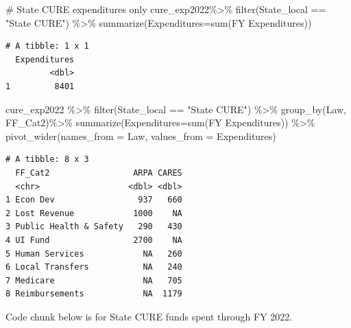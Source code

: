 \documentclass[
  letterpaper,
  DIV=11,
  numbers=noendperiod]{scrreport}
\newenvironment{Shaded}{\begin{snugshade}}{\end{snugshade}}
\newcommand{\AttributeTok}[1]{\textcolor[rgb]{0.40,0.45,0.13}{#1}}
\newcommand{\CommentTok}[1]{\textcolor[rgb]{0.37,0.37,0.37}{#1}}
\newcommand{\FunctionTok}[1]{\textcolor[rgb]{0.28,0.35,0.67}{#1}}
\newcommand{\NormalTok}[1]{\textcolor[rgb]{0.00,0.23,0.31}{#1}}
\newcommand{\SpecialCharTok}[1]{\textcolor[rgb]{0.37,0.37,0.37}{#1}}
\newcommand{\StringTok}[1]{\textcolor[rgb]{0.13,0.47,0.30}{#1}}
\begin{document}
\begin{Shaded}
\begin{Highlighting}[]
\CommentTok{\# State CURE expenditures only}
\NormalTok{cure\_exp2022}\SpecialCharTok{\%\textgreater{}\%}  
    \FunctionTok{filter}\NormalTok{(State\_local }\SpecialCharTok{==} \StringTok{"State CURE"}\NormalTok{) }\SpecialCharTok{\%\textgreater{}\%}
  \FunctionTok{summarize}\NormalTok{(}\AttributeTok{Expenditures=}\FunctionTok{sum}\NormalTok{(}\StringTok{\textasciigrave{}}\AttributeTok{FY Expenditures}\StringTok{\textasciigrave{}}\NormalTok{)) }
\end{Highlighting}
\end{Shaded}

\begin{verbatim}
# A tibble: 1 x 1
  Expenditures
         <dbl>
1         8401
\end{verbatim}

\begin{Shaded}
\begin{Highlighting}[]
\NormalTok{cure\_exp2022 }\SpecialCharTok{\%\textgreater{}\%} 
  \FunctionTok{filter}\NormalTok{(State\_local }\SpecialCharTok{==} \StringTok{"State CURE"}\NormalTok{) }\SpecialCharTok{\%\textgreater{}\%}
  \FunctionTok{group\_by}\NormalTok{(Law, FF\_Cat2)}\SpecialCharTok{\%\textgreater{}\%} 
  \FunctionTok{summarize}\NormalTok{(}\AttributeTok{Expenditures=}\FunctionTok{sum}\NormalTok{(}\StringTok{\textasciigrave{}}\AttributeTok{FY Expenditures}\StringTok{\textasciigrave{}}\NormalTok{)) }\SpecialCharTok{\%\textgreater{}\%}
  \FunctionTok{pivot\_wider}\NormalTok{(}\AttributeTok{names\_from =}\NormalTok{ Law, }\AttributeTok{values\_from =}\NormalTok{ Expenditures)}
\end{Highlighting}
\end{Shaded}

\begin{verbatim}
# A tibble: 8 x 3
  FF_Cat2                 ARPA CARES
  <chr>                  <dbl> <dbl>
1 Econ Dev                 937   660
2 Lost Revenue            1000    NA
3 Public Health & Safety   290   430
4 UI Fund                 2700    NA
5 Human Services            NA   260
6 Local Transfers           NA   240
7 Medicare                  NA   705
8 Reimbursements            NA  1179
\end{verbatim}

Code chunk below is for State CURE funds spent through FY 2022.
\end{document}
